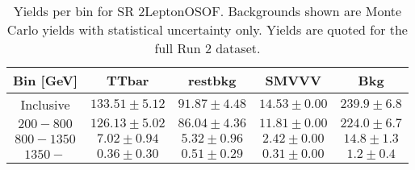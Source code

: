 \begin{table}[!htbp]
    \small
    \center
    \begin{tabular}{c|c|c|c||c}
    Bin [GeV] & TTbar & restbkg & SMVVV & Bkg\\
    \hline
    Inclusive & $133.51 \pm 5.12$ & $91.87 \pm 4.48$ & $14.53 \pm 0.00$ & $239.9 \pm 6.8$\\
    \hline
    $200-800$ & $126.13 \pm 5.02$ & $86.04 \pm 4.36$ & $11.81 \pm 0.00$ & $224.0 \pm 6.7$\\
    \hline
    $800-1350$ & $7.02 \pm 0.94$ & $5.32 \pm 0.96$ & $2.42 \pm 0.00$ & $14.8 \pm 1.3$\\
    \hline
    $1350-$ & $0.36 \pm 0.30$ & $0.51 \pm 0.29$ & $0.31 \pm 0.00$ & $1.2 \pm 0.4$\\
\end{tabular}
    \caption{Yields per bin for SR 2LeptonOSOF. Backgrounds shown are Monte Carlo yields with statistical uncertainty only. Yields are quoted for the full Run 2 dataset.}
    \label{tab:2LeptonOSOF$bins}
\end{table}
